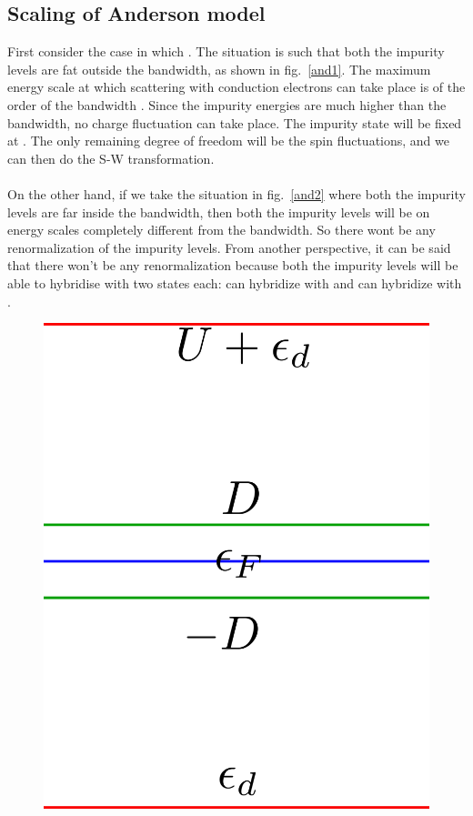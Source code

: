 \documentclass[14pt]{extarticle}
\numberwithin{equation}{section}
\begin{document}
{\subsection{Scaling of Anderson model}
First consider the case in which .
The situation is such that both the impurity levels are fat outside the bandwidth, as shown in fig.~\ref{and1}.
The maximum energy scale at which scattering with conduction electrons can take place is of the order of the bandwidth .
Since the impurity energies are much higher than the bandwidth, no charge fluctuation can take place.
The impurity state will be fixed at .
The only remaining degree of freedom will be the spin fluctuations, and we can then do the S-W transformation.\\\\
On the other hand, if we take the situation in fig.~\ref{and2} where both the impurity levels are far inside the bandwidth, then both the impurity levels will be on energy scales completely different from the bandwidth.
So there wont be any renormalization of the impurity levels.
From another perspective, it can be said that there won't be any renormalization because both the impurity levels  will be able to hybridise with two states each:  can hybridize with  and \il{\ket{1\sigma}} can hybridize with .
\begin{figure}
\begin{minipage}{220pt}
	\centering
       	\includegraphics[scale=0.28]{anderson.png}

\end{minipage}
\end{figure}}
\end{document}
